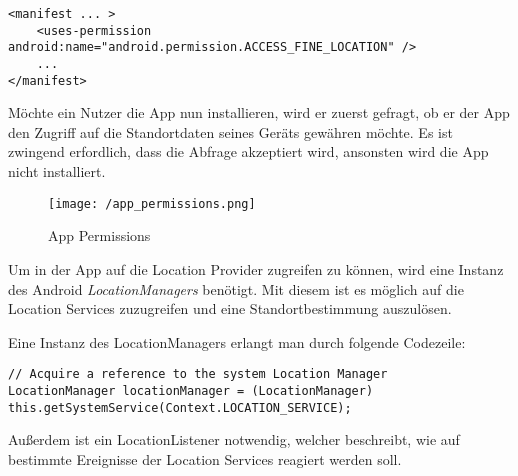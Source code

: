 \begin{lstlisting}[caption={App Permissions},label=lst:locationPermission]
<manifest ... >
    <uses-permission android:name="android.permission.ACCESS_FINE_LOCATION" />
    ...
</manifest>
\end{lstlisting}

Möchte ein Nutzer die App nun installieren, wird er zuerst gefragt, ob er der App den Zugriff auf die Standortdaten seines Geräts gewähren möchte. Es ist zwingend erfordlich, dass die Abfrage akzeptiert wird, ansonsten wird die App nicht installiert.

\begin{figure}[H]
	\centering
	\texttt{[image: /app\_permissions.png]}
	\caption[Lokalisierung: App Permissions]{App Permissions}
	\label{fig:appPermissions}
	\vspace{-5mm}
\end{figure}

Um in der App auf die Location Provider zugreifen zu können, wird eine Instanz des Android \textit{LocationManagers} benötigt. Mit diesem ist es möglich auf die Location Services zuzugreifen und eine Standortbestimmung auszulösen.

Eine Instanz des LocationManagers erlangt man durch folgende Codezeile:

\begin{lstlisting}[caption={LocationManager Instanz},label=lst:locationManagerInstance, basicstyle=\footnotesize]
// Acquire a reference to the system Location Manager
LocationManager locationManager = (LocationManager) this.getSystemService(Context.LOCATION_SERVICE);
\end{lstlisting}

Außerdem ist ein LocationListener notwendig, welcher beschreibt, wie auf bestimmte Ereignisse der Location Services reagiert werden soll.

